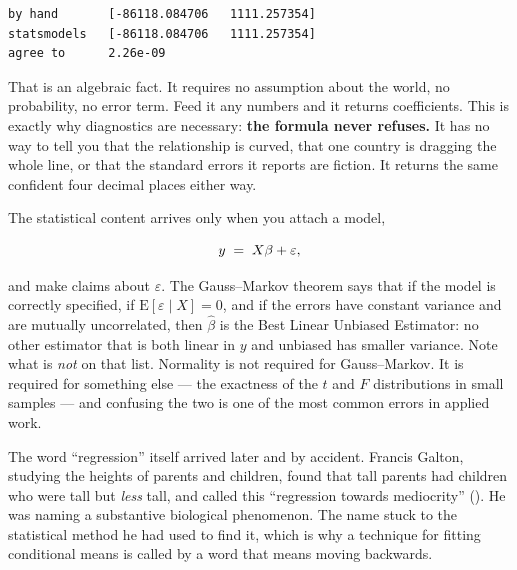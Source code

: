\documentclass[
  letterpaper,
  10pt,
  twoside,
  openright,
  numbers=noenddot,
  chapterprefix=true]{scrbook}
\begin{document}
\begin{verbatim}
by hand       [-86118.084706   1111.257354]
statsmodels   [-86118.084706   1111.257354]
agree to      2.26e-09
\end{verbatim}

That is an algebraic fact. It requires no assumption about the world, no
probability, no error term. Feed it any numbers and it returns
coefficients. This is exactly why diagnostics are necessary: \textbf{the
formula never refuses.} It has no way to tell you that the relationship
is curved, that one country is dragging the whole line, or that the
standard errors it reports are fiction. It returns the same confident
four decimal places either way.

The statistical content arrives only when you attach a model,

\[
y \thickspace=\thickspace X\beta + \varepsilon ,
\]

and make claims about \(\varepsilon\). The Gauss--Markov theorem says
that if the model is correctly specified, if
\(\mathrm{E}[\varepsilon \mid X] = 0\), and if the errors have constant
variance and are mutually uncorrelated, then \(\hat\beta\) is the Best
Linear Unbiased Estimator: no other estimator that is both linear in
\(y\) and unbiased has smaller variance. Note what is \emph{not} on that
list. Normality is not required for Gauss--Markov. It is required for
something else --- the exactness of the \(t\) and \(F\) distributions in
small samples --- and confusing the two is one of the most common errors
in applied work.

The word ``regression'' itself arrived later and by accident. Francis
Galton, studying the heights of parents and children, found that tall
parents had children who were tall but \emph{less} tall, and called this
``regression towards mediocrity'' (). He was naming a substantive biological phenomenon. The name
stuck to the statistical method he had used to find it, which is why a
technique for fitting conditional means is called by a word that means
moving backwards.
\end{document}
